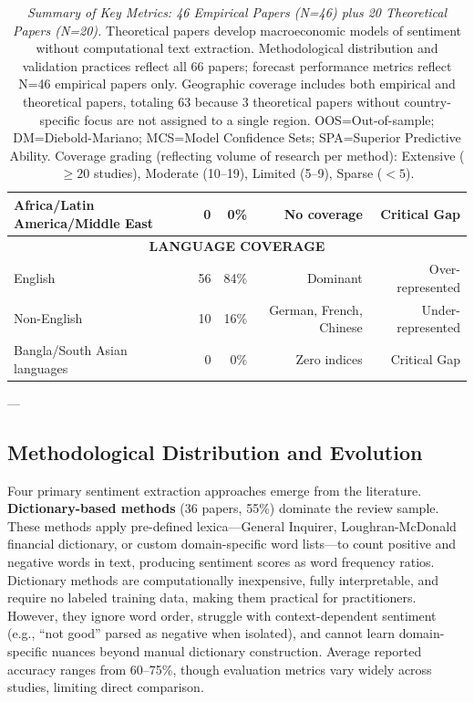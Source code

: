 \documentclass[11pt]{article}
\begin{document}
\begin{table}[htbp]
\begin{tabular}{|l|r|r|r|r|}
Africa/Latin America/Middle East & 0 & 0\% & No coverage & Critical Gap \\
\hline
\multicolumn{5}{|c|}{\textbf{LANGUAGE COVERAGE}} \\
\hline
English & 56 & 84\% & Dominant & Over-represented \\
Non-English & 10 & 16\% & German, French, Chinese & Under-represented \\
Bangla/South Asian languages & 0 & 0\% & Zero indices & Critical Gap \\
\hline
\end{tabular}
\caption{\textit{Summary of Key Metrics: 46 Empirical Papers (N=46) plus 20 Theoretical Papers (N=20).} Theoretical papers develop macroeconomic models of sentiment without computational text extraction. Methodological distribution and validation practices reflect all 66 papers; forecast performance metrics reflect N=46 empirical papers only. Geographic coverage includes both empirical and theoretical papers, totaling 63 because 3 theoretical papers without country-specific focus are not assigned to a single region. OOS=Out-of-sample; DM=Diebold-Mariano; MCS=Model Confidence Sets; SPA=Superior Predictive Ability. Coverage grading (reflecting volume of research per method): Extensive ($\geq 20$ studies), Moderate (10--19), Limited (5--9), Sparse ($<5$).}
\label{tab:metasummary}
\end{table}

---

\subsection{Methodological Distribution and Evolution}

Four primary sentiment extraction approaches emerge from the literature. \textbf{Dictionary-based methods} (36 papers, 55\%) dominate the review sample. These methods apply pre-defined lexica---General Inquirer, Loughran-McDonald financial dictionary, or custom domain-specific word lists---to count positive and negative words in text, producing sentiment scores as word frequency ratios. Dictionary methods are computationally inexpensive, fully interpretable, and require no labeled training data, making them practical for practitioners. However, they ignore word order, struggle with context-dependent sentiment (e.g., ``not good'' parsed as negative when isolated), and cannot learn domain-specific nuances beyond manual dictionary construction. Average reported accuracy ranges from 60--75\%, though evaluation metrics vary widely across studies, limiting direct comparison.
\end{document}
